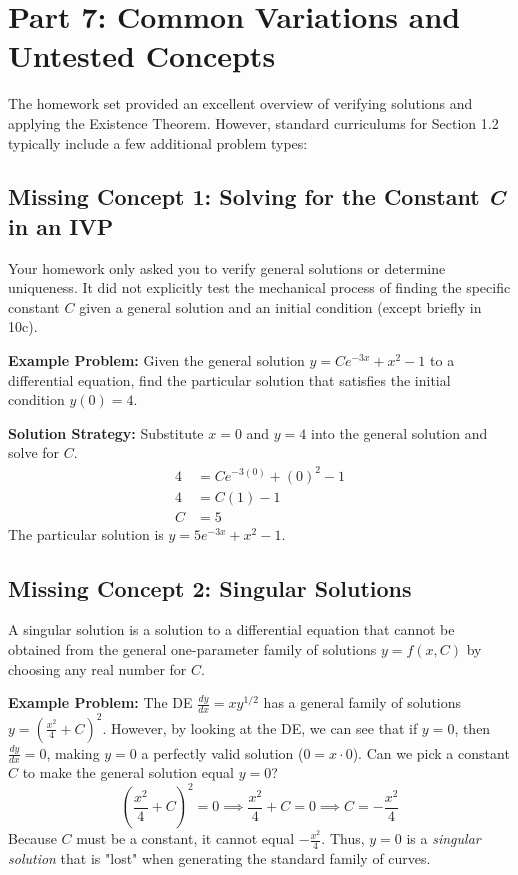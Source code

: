 \documentclass[12pt]{article}
\begin{document}
\newpage
\section{Part 7: Common Variations and Untested Concepts}

The homework set provided an excellent overview of verifying solutions and applying the Existence Theorem. However, standard curriculums for Section 1.2 typically include a few additional problem types:

\subsection{Missing Concept 1: Solving for the Constant \textit{C} in an IVP}
Your homework only asked you to verify general solutions or determine uniqueness. It did not explicitly test the mechanical process of finding the specific constant $C$ given a general solution and an initial condition (except briefly in 10c).

\textbf{Example Problem:} Given the general solution $y = Ce^{-3x} + x^2 - 1$ to a differential equation, find the particular solution that satisfies the initial condition $y(0) = 4$.

\textbf{Solution Strategy:} Substitute $x = 0$ and $y = 4$ into the general solution and solve for $C$.
\begin{align*}
    4 &= C e^{-3(0)} + (0)^2 - 1 \\
    4 &= C(1) - 1 \\
    C &= 5
\end{align*}
The particular solution is $y = 5e^{-3x} + x^2 - 1$.

\subsection{Missing Concept 2: Singular Solutions}
A singular solution is a solution to a differential equation that cannot be obtained from the general one-parameter family of solutions $y = f(x, C)$ by choosing any real number for $C$. 

\textbf{Example Problem:} The DE $\frac{dy}{dx} = xy^{1/2}$ has a general family of solutions $y = \left( \frac{x^2}{4} + C \right)^2$. However, by looking at the DE, we can see that if $y = 0$, then $\frac{dy}{dx} = 0$, making $y=0$ a perfectly valid solution ($0 = x \cdot 0$). 
Can we pick a constant $C$ to make the general solution equal $y=0$?
\[ \left( \frac{x^2}{4} + C \right)^2 = 0 \implies \frac{x^2}{4} + C = 0 \implies C = -\frac{x^2}{4} \]
Because $C$ must be a constant, it cannot equal $-\frac{x^2}{4}$. Thus, $y=0$ is a \textit{singular solution} that is "lost" when generating the standard family of curves.
\end{document}
